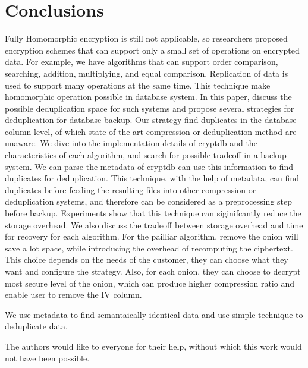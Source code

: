 



\section{Conclusions}

Fully Homomorphic encryption is still not applicable, so researchers proposed encryption schemes that can support only a small set of operations on encrypted data. For example, we have algorithms that can support order comparison, searching, addition, multiplying, and equal comparison. Replication of data is used to support many operations at the same time. This technique make homomorphic operation possible in database system. In this paper, discuss the possible deduplication space for such systems and propose several strategies for deduplication for database backup. Our strategy find duplicates in the database column level, of which state of the art compression or deduplication method are unaware. We dive into the implementation details of cryptdb and the characteristics of each algorithm, and search for possible tradeoff in a backup system. We can parse the metadata of cryptdb can use this information to find duplicates for deduplication. This technique, with the help of metadata, can find duplicates before feeding the resulting files into other compression or deduplication systems, and therefore can be considered as a preprocessing step before backup. Experiments show that this technique can siginifcantly reduce the storage overhead. We also discuss the tradeoff between storage overhead and time for recovery for each algorithm. For the pailliar algorithm, remove the onion will save a lot space, while introducing the overhead of recomputing the ciphertext. This choice depends on the needs of the customer, they can choose what they want and configure the strategy. Also, for each onion, they can choose to decrypt most secure level of the onion, which can produce higher compression ratio and enable user to remove the IV column. 

We use metadata to find semantaically identical data and use simple technique to deduplicate data.

\begin{acks}
  The authors would like to everyone for their help, without which this work would not have been possible. 
\end{acks}